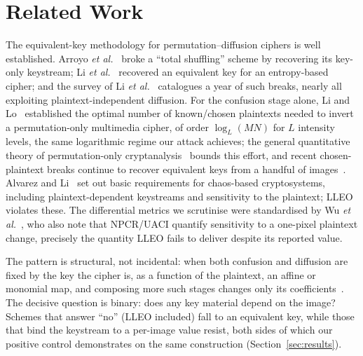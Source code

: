 \documentclass[conference,a4paper]{IEEEtran}
\begin{document}
\section{Related Work}
The equivalent-key methodology for permutation--diffusion ciphers is well established. Arroyo
\emph{et al.}~\cite{arroyo2009} broke a ``total shuffling'' scheme by recovering its key-only
keystream; Li \emph{et al.}~\cite{li2018entropy} recovered an equivalent key for an entropy-based
cipher; and the survey of Li \emph{et al.}~\cite{li2019attacker} catalogues a year of such breaks,
nearly all exploiting plaintext-independent diffusion. For the confusion stage alone, Li and
Lo~\cite{li2011optimal} established the optimal number of known/chosen plaintexts needed to invert a
permutation-only multimedia cipher, of order $\log_{L} (MN)$ for $L$ intensity levels, the same
logarithmic regime our attack achieves; the general quantitative theory of permutation-only
cryptanalysis~\cite{Li2008general} bounds this effort, and recent chosen-plaintext breaks continue to
recover equivalent keys from a handful of images~\cite{Ma2020cryptanalysis,Zhao2025cryptanalysis}. Alvarez and Li~\cite{alvarez2006} set out basic requirements
for chaos-based cryptosystems, including plaintext-dependent keystreams and sensitivity to the
plaintext; LLEO violates these. The differential metrics we scrutinise were standardised by Wu
\emph{et al.}~\cite{wu2011npcr}, who also note that NPCR/UACI quantify sensitivity to a one-pixel
plaintext change, precisely the quantity LLEO fails to deliver despite its reported value.

The pattern is structural, not incidental: when both confusion and diffusion are fixed by the key the
cipher is, as a function of the plaintext, an affine or monomial map, and composing more such stages
changes only its coefficients~\cite{li2019attacker,li2011optimal}. The decisive question is binary: does
any key material depend on the image? Schemes that answer ``no'' (LLEO included) fall to an equivalent
key, while those that bind the keystream to a per-image value resist, both sides of which our positive
control demonstrates on the same construction (Section~\ref{sec:results}).
\end{document}
